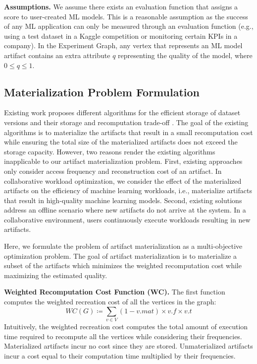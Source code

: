 \textbf{Assumptions. }
We assume there exists an evaluation function that assigns a score to user-created ML models.
This is a reasonable assumption as the success of any ML application can only be measured through an evaluation function (e.g., using a test dataset in a Kaggle competition or monitoring certain KPIs in a company).
In the Experiment Graph, any vertex that represents an ML model artifact contains an extra attribute $q$ representing the quality of the model, where $0 \leq q \leq 1$.

\subsection{Materialization Problem Formulation}\label{subsec-materialization-problem}
Existing work proposes different algorithms for the efficient storage of dataset versions and their storage and recomputation trade-off \cite{bhattacherjee2015principles}.
The goal of the existing algorithms is to materialize the artifacts that result in a small recomputation cost while ensuring the total size of the materialized artifacts does not exceed the storage capacity.
However, two reasons render the existing algorithms inapplicable to our artifact materialization problem.
First, existing approaches only consider access frequency and reconstruction cost of an artifact.
In collaborative workload optimization, we consider the effect of the materialized artifacts on the efficiency of machine learning workloads, i.e., materialize artifacts that result in high-quality machine learning models.
Second, existing solutions address an offline scenario where new artifacts do not arrive at the system.
In a collaborative environment, users continuously execute workloads resulting in new artifacts.

Here, we formulate the problem of artifact materialization as a multi-objective optimization problem.
The goal of artifact materialization is to materialize a subset of the artifacts which minimizes the weighted recomputation cost while maximizing the estimated quality.

\textbf{Weighted Recomputation Cost Function (WC).} 
The first function computes the weighted recreation cost of all the vertices in the graph:
\[
WC(G) \coloneqq  \sum\limits_{v \in V}  (1-v.mat) \times v.f \times v.t
\]
Intuitively, the weighted recreation cost computes the total amount of execution time required to recompute all the vertices while considering their frequencies.
Materialized artifacts incur no cost since they are stored.
Unmaterialized artifacts incur a cost equal to their computation time multiplied by their frequencies.

